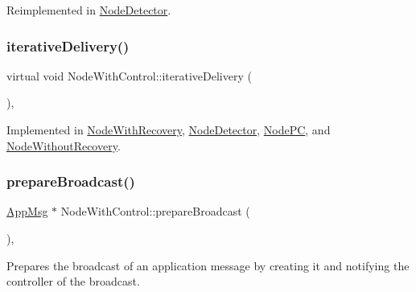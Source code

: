 Reimplemented in \hyperlink{class_node_detector_aefa188ab0657837b1b57f24674d3ef22}{Node\+Detector}.

\mbox{\label{class_node_with_control_a4f78078272b90937e0746c797443b37d}} 
\subsubsection{\texorpdfstring{iterative\+Delivery()}{iterativeDelivery()}}
{\footnotesize\ttfamily virtual void Node\+With\+Control\+::iterative\+Delivery (\begin{DoxyParamCaption}{ }\end{DoxyParamCaption})\hspace{0.3cm}{\ttfamily [protected]}, {}}



Implemented in \hyperlink{class_node_with_recovery_a9b61912f38b62452584dc80bf261ef4e}{Node\+With\+Recovery}, \hyperlink{class_node_detector_a17ecf9939fce7471f4513b66185743cc}{Node\+Detector}, \hyperlink{class_node_p_c_a7ac363db597ebadd3b18dd4343440aa1}{Node\+PC}, and \hyperlink{class_node_without_recovery_a65e21db6d6b4e72b898fd567f8b4aee2}{Node\+Without\+Recovery}.

\mbox{\label{class_node_with_control_ab871014cf3f42d834f8d34ad5498174c}} 
\subsubsection{\texorpdfstring{prepare\+Broadcast()}{prepareBroadcast()}}
{\footnotesize\ttfamily \hyperlink{class_app_msg}{App\+Msg} $\ast$ Node\+With\+Control\+::prepare\+Broadcast (\begin{DoxyParamCaption}{ }\end{DoxyParamCaption})\hspace{0.3cm}{\ttfamily [protected]}, {\ttfamily [virtual]}}



Prepares the broadcast of an application message by creating it and notifying the controller of the broadcast. 

